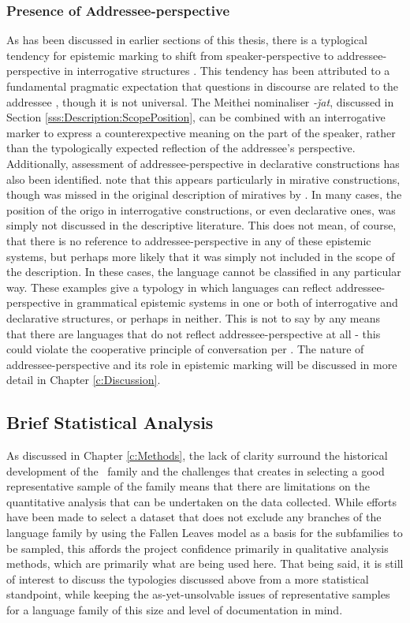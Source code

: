 \subsubsection{Presence of Addressee-perspective}\label{sss:Description:AddrPersp}
As has been discussed in earlier sections of this thesis, there is a typlogical tendency for epistemic marking to shift from speaker-perspective to addressee-perspective in interrogative structures \cite{Aikhenvald2004}. This tendency has been attributed to a fundamental pragmatic expectation that questions in discourse are related to the addressee \cite{Hill2020}, though it is not universal. The Meithei \cite[Internal Isolate: India,][296]{Chelliah1997} nominaliser \textit{-ǰat}, discussed in Section \ref{sss:Description:ScopePosition}, can be combined with an interrogative marker to express a counterexpective meaning on the part of the speaker, rather than the typologically expected reflection of the addressee's perspective. Additionally, assessment of addressee-perspective in declarative constructions has also been identified.  note that this appears particularly in mirative constructions, though was missed in the original description of miratives by . In many cases, the position of the origo in interrogative constructions, or even declarative ones, was simply not discussed in the descriptive literature. This does not mean, of course, that there is no reference to addressee-perspective in any of these epistemic systems, but perhaps more likely that it was simply not included in the scope of the description. In these cases, the language cannot be classified in any particular way. These examples give a typology in which languages can reflect addressee-perspective in grammatical epistemic systems in one or both of interrogative and declarative structures, or perhaps in neither. This is not to say by any means that there are languages that do not reflect addressee-perspective at all - this could violate the cooperative principle of conversation per . The nature of addressee-perspective and its role in epistemic marking will be discussed in more detail in Chapter \ref{c:Discussion}.

\subsection{Brief Statistical Analysis}
As discussed in Chapter \ref{c:Methods}, the lack of clarity surround the historical development of the \lfam\ family and the challenges that creates in selecting a good representative sample of the family means that there are limitations on the quantitative analysis that can be undertaken on the data collected. While efforts have been made to select a dataset that does not exclude any branches of the language family by using the Fallen Leaves model \cite{VanDriem2014} as a basis for the subfamilies to be sampled, this affords the project confidence primarily in qualitative analysis methods, which are primarily what are being used here. That being said, it is still of interest to discuss the typologies discussed above from a more statistical standpoint, while keeping the as-yet-unsolvable issues of representative samples for a language family of this size and level of documentation in mind. 
